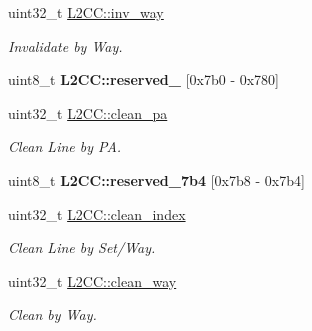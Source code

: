 \begin{DoxyCompactItemize}
\item 
\mbox{\label{group__L2C-310__cache_ga9ef4dc6545a03aeaca3f760e596a9f54}} 
uint32\+\_\+t \mbox{\hyperlink{group__L2C-310__cache_ga9ef4dc6545a03aeaca3f760e596a9f54}{L2\+C\+C\+::inv\+\_\+way}}
\begin{DoxyCompactList}\small\item\em Invalidate by Way. \end{DoxyCompactList}\item 
\mbox{\label{group__L2C-310__cache_ga5bb352b55ae07f48c84ce0b2e5721389}} 
uint8\+\_\+t {\bfseries L2\+C\+C\+::reserved\+\_} \mbox{[}0x7b0 -\/ 0x780\mbox{]}
\item 
\mbox{\label{group__L2C-310__cache_gad73834dceb6b3f92e1f86f409b2749a6}} 
uint32\+\_\+t \mbox{\hyperlink{group__L2C-310__cache_gad73834dceb6b3f92e1f86f409b2749a6}{L2\+C\+C\+::clean\+\_\+pa}}
\begin{DoxyCompactList}\small\item\em Clean Line by PA. \end{DoxyCompactList}\item 
\mbox{\label{group__L2C-310__cache_ga0691fd4fa4b258a002c3107f2ce20fdb}} 
uint8\+\_\+t {\bfseries L2\+C\+C\+::reserved\+\_\+7b4} \mbox{[}0x7b8 -\/ 0x7b4\mbox{]}
\item 
\mbox{\label{group__L2C-310__cache_ga966f3adfeb498ab72596f507ac5451d0}} 
uint32\+\_\+t \mbox{\hyperlink{group__L2C-310__cache_ga966f3adfeb498ab72596f507ac5451d0}{L2\+C\+C\+::clean\+\_\+index}}
\begin{DoxyCompactList}\small\item\em Clean Line by Set/\+Way. \end{DoxyCompactList}\item 
\mbox{\label{group__L2C-310__cache_ga53e9a59e6f64df7e8ad23b8c68369fa5}} 
uint32\+\_\+t \mbox{\hyperlink{group__L2C-310__cache_ga53e9a59e6f64df7e8ad23b8c68369fa5}{L2\+C\+C\+::clean\+\_\+way}}
\begin{DoxyCompactList}\small\item\em Clean by Way. \end{DoxyCompactList}\item 

\end{DoxyCompactItemize}
